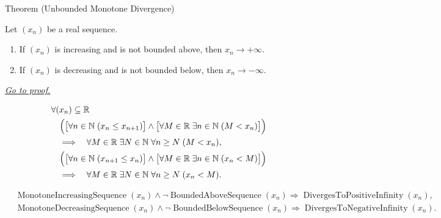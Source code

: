 
\begin{theorembox}{Theorem (Unbounded Monotone Divergence)}
\begin{theorem}
\label{thm:unbounded-monotone-divergence}
Let $(x_n)$ be a real sequence.
\begin{enumerate}[label=(\alph*)]
  \item If $(x_n)$ is increasing and is not bounded above, then
  $x_n\to+\infty$.
  \item If $(x_n)$ is decreasing and is not bounded below, then
  $x_n\to-\infty$.
\end{enumerate}

\smallskip
\noindent
\hyperref[prf:unbounded-monotone-divergence]{\textit{Go to proof.}}
\end{theorem}
\end{theorembox}

\begin{remark*}
\[
\begin{aligned}
&\forall (x_n)\subseteq\mathbb{R}\\
&\quad
\Bigl(
  \bigl[\forall n\in\mathbb{N}\;(x_n\le x_{n+1})\bigr]
  \land
  \bigl[\forall M\in\mathbb{R}\;\exists n\in\mathbb{N}\;(M<x_n)\bigr]
\Bigr)\\
&\quad\Longrightarrow\quad
\forall M\in\mathbb{R}\;\exists N\in\mathbb{N}\;\forall n\ge N\;(M<x_n),\\
&\quad
\Bigl(
  \bigl[\forall n\in\mathbb{N}\;(x_{n+1}\le x_n)\bigr]
  \land
  \bigl[\forall M\in\mathbb{R}\;\exists n\in\mathbb{N}\;(x_n<M)\bigr]
\Bigr)\\
&\quad\Longrightarrow\quad
\forall M\in\mathbb{R}\;\exists N\in\mathbb{N}\;\forall n\ge N\;(x_n<M).
\end{aligned}
\]
\end{remark*}

\begin{remark*}
\[
\begin{aligned}
&\operatorname{MonotoneIncreasingSequence}(x_n)
\land
\neg\operatorname{BoundedAboveSequence}(x_n)
\Longrightarrow
\operatorname{DivergesToPositiveInfinity}(x_n),\\
&\operatorname{MonotoneDecreasingSequence}(x_n)
\land
\neg\operatorname{BoundedBelowSequence}(x_n)
\Longrightarrow
\operatorname{DivergesToNegativeInfinity}(x_n).
\end{aligned}
\]
\end{remark*}

